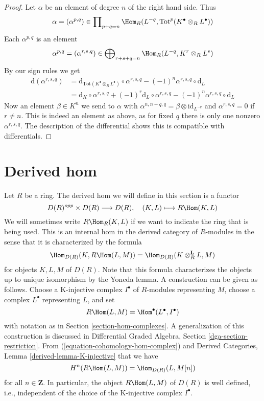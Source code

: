\begin{proof}
Let $\alpha$ be an element of degree $n$ of the right hand side.
Thus
$$
\alpha = (\alpha^{p, q}) \in \prod\nolimits_{p + q = n}
\Hom_R(L^{-q}, \text{Tot}^p(K^\bullet \otimes_R L^\bullet))
$$
Each $\alpha^{p, q}$ is an element
$$
\alpha^{p, q} = (\alpha^{r, s, q}) \in
\bigoplus\nolimits_{r + s + q = n} \Hom_R(L^{-q}, K^r \otimes_R L^s)
$$
By our sign rules we get
\begin{align*}
\text{d}(\alpha^{r, s, q})
& =
\text{d}_{\text{Tot}(K^\bullet \otimes_R L^\bullet)} \circ \alpha^{r, s, q}
- (-1)^n \alpha^{r, s, q} \circ \text{d}_L \\
& =
\text{d}_K \circ \alpha^{r, s, q} + (-1)^r \text{d}_L \circ \alpha^{r, s, q}
- (-1)^n \alpha^{r, s, q} \circ \text{d}_L
\end{align*}
Now an element $\beta \in K^n$ we send to $\alpha$ with
$\alpha^{n, n - q, q} = \beta \otimes \text{id}_{L^{-q}}$
and $\alpha^{r, s, q} = 0$ if $r \not = n$. This is indeed
an element as above, as for fixed $q$ there is only one nonzero
$\alpha^{r, s, q}$. The description of
the differential shows this is compatible with differentials.
\end{proof}




\section{Derived hom}
\label{section-RHom}

\noindent
Let $R$ be a ring. The derived hom we will define in this section is a functor
$$
D(R)^{opp} \times D(R) \longrightarrow D(R),\quad
(K, L) \longmapsto R\Hom(K, L)
$$
We will sometimes write $R\Hom_R(K, L)$ if we want to indicate the
ring that is being used. This is an internal hom in the derived category of
$R$-modules in the sense that it is characterized by the formula
\begin{equation}
\label{equation-internal-hom}
\Hom_{D(R)}(K, R\Hom(L, M))
=
\Hom_{D(R)}(K \otimes_R^\mathbf{L} L, M)
\end{equation}
for objects $K, L, M$ of $D(R)$. Note that this formula characterizes
the objects up to unique isomorphism by the Yoneda lemma. A construction
can be given as follows. Choose a K-injective complex $I^\bullet$
of $R$-modules representing $M$, choose a complex $L^\bullet$
representing $L$, and set
$$
R\Hom(L, M) = \Hom^\bullet(L^\bullet, I^\bullet)
$$
with notation as in Section \ref{section-hom-complexes}.
A generalization of this construction is discussed in
Differential Graded Algebra, Section \ref{dga-section-restriction}.
From (\ref{equation-cohomology-hom-complex}) and
Derived Categories, Lemma \ref{derived-lemma-K-injective}
that we have
\begin{equation}
\label{equation-h0-RHom}
H^n(R\Hom(L, M)) = \Hom_{D(R)}(L, M[n])
\end{equation}
for all $n \in \mathbf{Z}$. In particular, the object
$R\Hom(L, M)$ of $D(R)$ is well defined, i.e., independent of
the choice of the K-injective complex $I^\bullet$.

